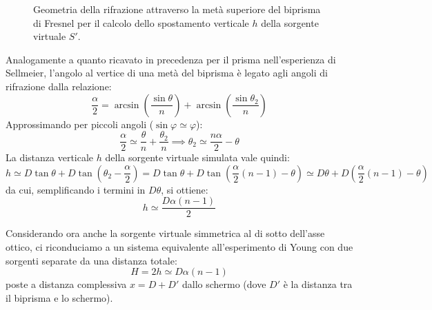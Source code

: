 \documentclass[openany,a4paper,12pt]{book}
\begin{document}
\begin{figure}[H]
    \caption{Geometria della rifrazione attraverso la metà superiore del biprisma di Fresnel per il calcolo dello spostamento verticale $h$ della sorgente virtuale $S'$.}
\end{figure}

Analogamente a quanto ricavato in precedenza per il prisma nell'esperienza di Sellmeier, l'angolo al vertice di una metà del biprisma è legato agli angoli di rifrazione dalla relazione:
\[
    \frac{\alpha}{2} = \arcsin\left(\frac{\sin\theta}{n}\right) + \arcsin\left(\frac{\sin\theta_2}{n}\right)
\]
Approssimando per piccoli angoli ($\sin\varphi \simeq \varphi$):
\[
    \frac{\alpha}{2} \simeq \frac{\theta}{n} + \frac{\theta_2}{n} \implies \theta_2 \simeq \frac{n\alpha}{2} - \theta
\]
La distanza verticale $h$ della sorgente virtuale simulata vale quindi:
\[
    h \simeq D\tan\theta + D\tan\left(\theta_2 - \frac{\alpha}{2}\right) = D\tan\theta + D\tan\left(\frac{\alpha}{2}(n-1) - \theta\right) \simeq D\theta + D\left(\frac{\alpha}{2}(n-1) - \theta\right)
\]
da cui, semplificando i termini in $D\theta$, si ottiene:
\[
    h \simeq \frac{D\alpha(n - 1)}{2}
\]

Considerando ora anche la sorgente virtuale simmetrica al di sotto dell'asse ottico, ci riconduciamo a un sistema equivalente all'esperimento di Young con due sorgenti separate da una distanza totale:
\[
    H = 2h \simeq D\alpha(n - 1)
\]
poste a distanza complessiva $x = D + D'$ dallo schermo (dove $D'$ è la distanza tra il biprisma e lo schermo).
\end{document}
